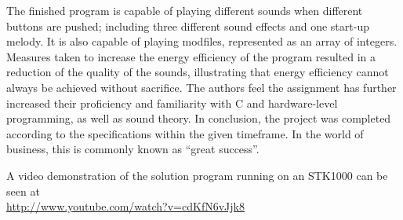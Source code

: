 The finished program is capable of playing different sounds when different buttons are pushed; including three different sound effects and one start-up melody.
It is also capable of playing modfiles, represented as an array of integers.
Measures taken to increase the energy efficiency of the program resulted in a reduction of the quality of the sounds, illustrating that energy efficiency cannot always be achieved without sacrifice.
The authors feel the assignment has further increased their proficiency and familiarity with C and hardware-level programming, as well as sound theory.
In conclusion, the project was completed according to the specifications within the given timeframe.
In the world of business, this is commonly known as ``great success''.

\begin{center}
A video demonstration of the solution program running on an STK1000 can be seen at \\
\url{http://www.youtube.com/watch?v=cdKfN6vJjk8}
\end{center}
